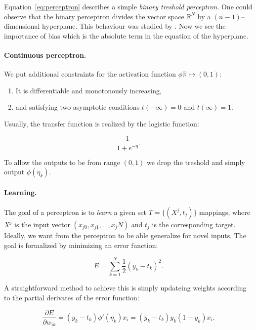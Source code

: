 Equation~\ref{eq:perceptron} describes a simple \emph{binary treshold perceptron}. One could observe that the binary perceptron divides the vector space $\mathbb{R}^N$ by a $(n-1)$--dimensional hyperplane. This behaviour was studied by \citet{rosenblatt1958perceptron}. Now we see the importance of bias which is the absolute term in the equation of the hyperplane. 

\paragraph{Continuous perceptron.}
We put additional constraints for the activation function $\phi \mathbb{R} \mapsto (0,1)$: 
\begin{enumerate} 
\item It is differentiable and monotonously increasing,
\item and satisfying two asymptotic conditions $t(-\infty)=0$ and $t(\infty)=1$. 
\end{enumerate} 
Usually, the transfer function is realized by the logistic function: 

\begin{equation}
\frac{1}{1 + e^{-\eta}}. 
\end{equation} 

To allow the outputs to be from range $(0,1)$ we drop the treshold and simply output $\phi(\eta_k)$. 

\paragraph{Learning.} 
The goal of a perceptron is to \emph{learn} a given set $T = \{(X^j, t_j)\}$ mappings, where $X^j$ is the input vector $(x_{j0},x_{j1}, \ldots, x_jN)$ and $t_j$ is the corresponding target. Ideally, we want from the perceptron to be able generalize for novel inputs. The goal is formalized by minimizing an error function: 

\begin{equation}
\label{eq:perceptron-error} 
E = \sum_{k=1}^{N} \frac{1}{2}(y_k-t_k)^2.
\end{equation} 

A straightforward method to achieve this is simply updateing weights according to the partial derivates of the error function: 

\begin{equation}
\label{eq:perceptron-learning} 
\frac{\partial E}{\partial w_{ik}} = (y_k - t_k)\phi'(\eta_k)x_i = (y_k - t_k)y_k(1 - y_k)x_i.
\end{equation} 

